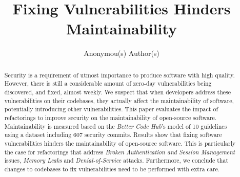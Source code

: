 \documentclass[10pt,conference]{IEEEtran}
\begin{document}
\title{Fixing Vulnerabilities Hinders Maintainability}

\author{
    Anonymou(s) Author(s)

}

\maketitle

\begin{abstract}
Security is a requirement of utmost importance to produce software with high
quality. However, there is still a considerable amount of zero-day
vulnerabilities being discovered, and fixed, almost weekly. We suspect that when
developers address these vulnerabilities on their codebases, they actually
affect the maintainability of software, potentially introducing other
vulnerabilities. This paper evaluates the impact of refactorings to improve
security on the maintainability of open-source software. Maintainability is
measured based on the \emph{Better Code Hub}'s model of 10 guidelines using a
dataset including 607 security commits. Results show that fixing software
vulnerabilities hinders the maintainability of open-source software. This is
particularly the case for refactorings that address \emph{Broken Authentication
and Session Management} issues, \emph{Memory Leaks} and \emph{Denial-of-Service}
attacks. Furthermore, we conclude that changes to codebases to fix vulnerabilities
need to be performed with extra care.
\end{abstract}
\end{document}
